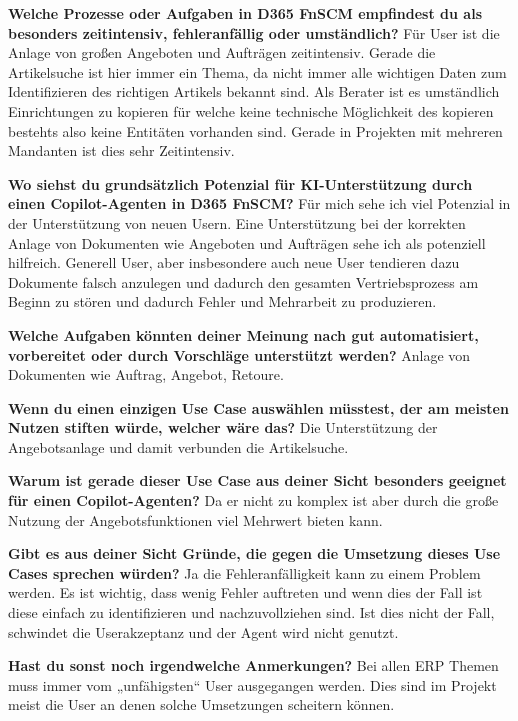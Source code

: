 \textbf{Welche Prozesse oder Aufgaben in D365 FnSCM empfindest du als besonders zeitintensiv, fehleranfällig oder umständlich?}\newline
Für User ist die Anlage von großen Angeboten und Aufträgen zeitintensiv. Gerade die Artikelsuche ist hier immer ein Thema, da nicht immer alle wichtigen Daten zum Identifizieren des richtigen Artikels bekannt sind. Als Berater ist es umständlich Einrichtungen zu kopieren für welche keine technische Möglichkeit des kopieren bestehts also keine Entitäten vorhanden sind. Gerade in Projekten mit mehreren Mandanten ist dies sehr Zeitintensiv.

\textbf{Wo siehst du grundsätzlich Potenzial für KI-Unterstützung durch einen Copilot-Agenten in D365 FnSCM?}\newline
Für mich sehe ich viel Potenzial in der Unterstützung von neuen Usern. Eine Unterstützung bei der korrekten Anlage von Dokumenten wie Angeboten und Aufträgen sehe ich als potenziell hilfreich. Generell User, aber insbesondere auch neue User tendieren dazu Dokumente falsch anzulegen und dadurch den gesamten Vertriebsprozess am Beginn zu stören und dadurch Fehler und Mehrarbeit zu produzieren.

\textbf{Welche Aufgaben könnten deiner Meinung nach gut automatisiert, vorbereitet oder durch Vorschläge unterstützt werden?}\newline
Anlage von Dokumenten wie Auftrag, Angebot, Retoure.

\textbf{Wenn du einen einzigen Use Case auswählen müsstest, der am meisten Nutzen stiften würde, welcher wäre das?}\newline
Die Unterstützung der Angebotsanlage und damit verbunden die Artikelsuche.

\textbf{Warum ist gerade dieser Use Case aus deiner Sicht besonders geeignet für einen Copilot-Agenten?}\newline
Da er nicht zu komplex ist aber durch die große Nutzung der Angebotsfunktionen viel Mehrwert bieten kann.

\textbf{Gibt es aus deiner Sicht Gründe, die gegen die Umsetzung dieses Use Cases sprechen würden?}\newline
Ja die Fehleranfälligkeit kann zu einem Problem werden. Es ist wichtig, dass wenig Fehler auftreten und wenn dies der Fall ist diese einfach zu identifizieren und nachzuvollziehen sind. Ist dies nicht der Fall, schwindet die Userakzeptanz und der Agent wird nicht genutzt.

\textbf{Hast du sonst noch irgendwelche Anmerkungen?}\newline
Bei allen ERP Themen muss immer vom „unfähigsten“ User ausgegangen werden. Dies sind im Projekt meist die User an denen solche Umsetzungen scheitern können.

